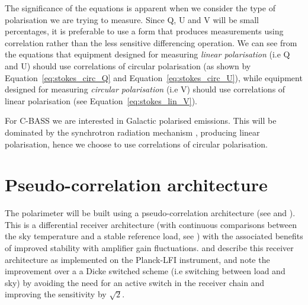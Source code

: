 The significance of the equations is apparent when we consider the type of polarisation we are trying to measure. Since Q, U and V will be small percentages, it is preferable to use a form that produces measurements using correlation rather than the less sensitive differencing operation. We can see from the equations that equipment designed for measuring \textit{linear polarisation} (i.e Q and U) should use correlations of circular polarisation (as shown by Equation~\ref{eq:stokes_circ_Q} and Equation~\ref{eq:stokes_circ_U}), while equipment designed for measuring \textit{circular polarisation} (i.e V) should use correlations of linear polarisation (see Equation~\ref{eq:stokes_lin_V}). 


For C-BASS we are interested in Galactic polarised emissions. This will be dominated by the synchrotron radiation mechanism \cite{Reich:2006iq},\cite{Bennett2003} producing linear polarisation, hence we choose to use correlations of circular polarisation.


\section{Pseudo-correlation architecture}
\label{sec:pseudoCorrelation}
The polarimeter will be built using a pseudo-correlation architecture (see  and ). This is a differential receiver architecture (with continuous comparisons between the sky temperature and a stable reference load, see ) with the associated benefits of improved stability with amplifier gain fluctuations.   and  describe this receiver architecture as implemented on the Planck-LFI instrument, and note the improvement over a a Dicke switched scheme (i.e switching between load and sky) by avoiding the need for an active switch in the receiver chain and improving the sensitivity by $\sqrt{2}$. 

